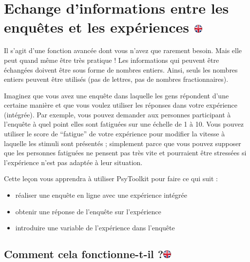 \documentclass[
]{book}
\providecommand{\tightlist}{%
  \setlength{\itemsep}{0pt}\setlength{\parskip}{0pt}}
\begin{document}
\hypertarget{echange-dinformations-entre-les-enquuxeates-et-les-expuxe9riences}{%
\chapter[Echange d'informations entre les enquêtes et les expériences ]{\texorpdfstring{Echange d'informations entre les enquêtes et les expériences \href{https://www.psytoolkit.org/lessons/var_in_out.html}{\protect\includegraphics{img/ukflag.png}}}{Echange d'informations entre les enquêtes et les expériences }}\label{echange-dinformations-entre-les-enquuxeates-et-les-expuxe9riences}}

Il s'agit d'une fonction avancée dont vous n'avez que rarement besoin. Mais elle peut quand même être très pratique ! Les informations qui peuvent être échangées doivent être sous forme de nombres entiers. Ainsi, seuls les nombres entiers peuvent être utilisés (pas de lettres, pas de nombres fractionnaires).

Imaginez que vous avez une enquête dans laquelle les gens répondent d'une certaine manière et que vous voulez utiliser les réponses dans votre expérience (intégrée). Par exemple, vous pouvez demander aux personnes participant à l'enquête à quel point elles sont fatiguées sur une échelle de 1 à 10. Vous pouvez utiliser le score de ``fatigue'' de votre expérience pour modifier la vitesse à laquelle les stimuli sont présentés ; simplement parce que vous pouvez supposer que les personnes fatiguées ne pensent pas très vite et pourraient être stressées si l'expérience n'est pas adaptée à leur situation.

Cette leçon vous apprendra à utiliser PsyToolkit pour faire ce qui suit :

\begin{itemize}
\tightlist
\item
  réaliser une enquête en ligne avec une expérience intégrée
\item
  obtenir une réponse de l'enquête sur l'expérience
\item
  introduire une variable de l'expérience dans l'enquête
\end{itemize}

\hypertarget{comment-cela-fonctionne-t-il}{%
\section[Comment cela fonctionne-t-il ?]{\texorpdfstring{Comment cela fonctionne-t-il ?\href{https://www.psytoolkit.org/lessons/var_in_out.html\#_how_it_works}{\protect\includegraphics{img/ukflag.png}}}{Comment cela fonctionne-t-il ?}}\label{comment-cela-fonctionne-t-il}}
\end{document}
